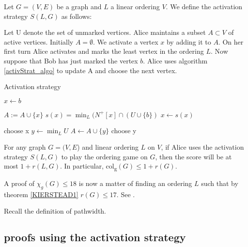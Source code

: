 \begin{definition} 
    Let $G=(V, E)$ be a graph and $L$ a linear ordering $V$. We define the activation strategy $S(L,G)$ as follows:
    
    Let U denote the set of unmarked vertices. Alice maintains a subset $A \subset V$ of active vertices. Initially $A = \emptyset$. We activate a vertex $x$ by adding it to $A$. On her first turn Alice activates and marks the least vertex in the ordering $L$. Now suppose that Bob has just marked the vertex $b$. Alice uses algorithm \ref{activStrat_algo} to update A and choose the
    next vertex.
    \begin{algorithm}[h]
        \caption{Activation strategy}
        \label{activStrat_algo}
        \begin{algorithmic}[1]
            \Statex
            \State $x \gets b$ 
            
                \State $A := A \cup \{x\}$
                \State $s(x) =\min_L(N^+[x] \cap (U \cup \{b\} )$
                \State $x \gets s(x)$
            \EndWhile      
            
                \State choose x
            \Else
                \State $y \gets \min_L U$
                    \State $A \gets A \cup \{y\}$                    
                \EndIf     
                \State choose y
            \EndIf   
        \end{algorithmic}
    \end{algorithm}
    
\end{definition}


\begin{theorem} \label{KIERSTEAD1}
    For any graph $G=(V, E$) and linear ordering $L$ on $V$, if Alice uses the activation strategy $S(L, G)$ to play the ordering game on $G$, then the score will be at most $1+r(L, G)$. In particular, col\textsubscript{g}$(G) \leq 1+r(G)$.
\end{theorem}

A proof of $\chi_g(G) \leq 18$ is now a matter of finding an ordering $L$ such that by theorem \ref{KIERSTEAD1} $r(G) \leq 17$. See \cite{KIERSTEAD2000}.

Recall the definition of pathwidth.

\subsection{proofs using the activation strategy}

